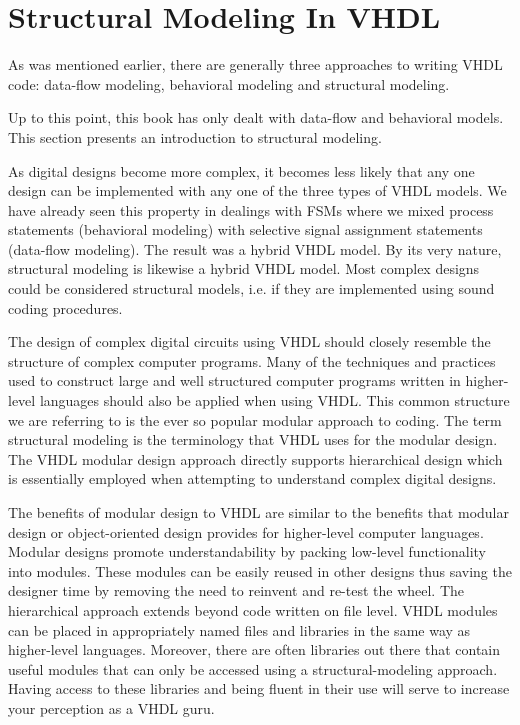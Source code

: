 %
%
\chapter{Structural Modeling In VHDL}
As was mentioned earlier, there are generally three approaches to writing VHDL code: data-flow modeling, behavioral modeling and structural modeling.

Up to this point, this book has only dealt with data-flow and behavioral models. This section presents an introduction to structural modeling. 

As digital designs become more complex, it becomes less likely that any one design can be implemented with any one of the three types of VHDL models. We have already seen this property in dealings with FSMs where we mixed process statements (behavioral modeling) with selective signal assignment statements (data-flow modeling). The result was a hybrid VHDL model. By its very nature, structural modeling is likewise a hybrid VHDL model. Most complex designs could be considered structural models, i.e. if they are implemented using sound coding procedures. 

The design of complex digital circuits using VHDL should closely resemble the structure of complex computer programs. Many of the techniques and practices used to construct large and well structured computer programs written in higher-level languages should also be applied when using VHDL. This common structure we are referring to is the ever so popular modular approach to coding. The term structural modeling is the terminology that VHDL uses for the modular design. The VHDL modular design approach directly supports hierarchical design which is essentially employed when attempting to understand complex digital designs. 

The benefits of modular design to VHDL are similar to the benefits that modular design or object-oriented design provides for higher-level computer languages. Modular designs promote understandability by packing low-level functionality into modules. These modules can be easily reused in other designs thus saving the designer time by removing the need to reinvent and re-test the wheel. The hierarchical approach extends beyond code written on file level. VHDL modules can be placed in appropriately named files and libraries in the same way as higher-level languages. Moreover, there are often libraries out there that contain useful modules that can only be accessed using a structural-modeling approach. Having access to these libraries and being fluent in their use will serve to increase your perception as a VHDL guru.

